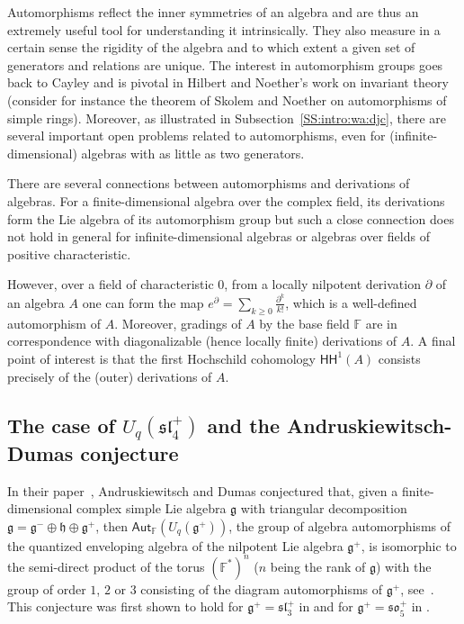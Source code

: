 \documentclass{commat}
\newcommand{\FF}{\mathbb{F}}
\newcommand\aut[1][\FF]{ \mathsf{Aut}_{#1}}
\newcommand\hoch{\mathsf{HH}}
\begin{document}
Automorphisms reflect the inner symmetries of an algebra and are thus an extremely useful tool for understanding it intrinsically. They also measure in a certain sense the rigidity of the algebra and to which extent a given set of generators and relations are unique. The interest in automorphism groups goes back to Cayley and is pivotal in Hilbert and Noether's work on invariant theory (consider for instance the theorem of Skolem and Noether on automorphisms of simple rings). Moreover, as illustrated in Subsection~\ref{SS:intro:wa:djc}, there are several important open problems related to automorphisms, even for (infinite-dimensional) algebras with as little as two generators.

There are several connections between automorphisms and derivations of algebras. For a finite-dimensional algebra over the complex field, its derivations form the Lie algebra of its automorphism group but such a close connection does not hold in general for infinite-dimensional algebras or algebras over fields of positive characteristic. 

However, over a field of characteristic $0$, from a locally nilpotent derivation $\partial$ of an algebra $A$ one can form the map $e^\partial=\sum_{k\geq 0}\frac{\partial^k}{k!}$, which is a well-defined automorphism of $A$. Moreover, gradings of $A$ by the base field $\FF$ are in correspondence with diagonalizable (hence locally finite) derivations of $A$. A final point of interest is that the first Hochschild cohomology $\hoch^1(A)$ consists precisely of the (outer) derivations of $A$.

\subsection{The case of \texorpdfstring{$U_q(\mathfrak{sl}^{+}_{4})$}{Uq(sl4+)} and the Andruskiewitsch-Dumas conjecture}\label{SS:isoautder:ADc}

In their paper~\cite{AD08}, Andruskiewitsch and Dumas conjectured that, given a finite\--di\-men\-sional complex simple Lie algebra $\mathfrak{g}$ with triangular decomposition 
$\mathfrak{g}=\mathfrak{g}^{-}\oplus\mathfrak{h}\oplus\mathfrak{g}^{+}$, then 
$\aut (U_{q}(\mathfrak{g}^{+}))$, the group of algebra automorphisms of the quantized enveloping algebra of the nilpotent Lie algebra $\mathfrak{g}^{+}$, is isomorphic to the semi-direct product of the torus $(\FF^{*})^n$ ($n$ being the rank of $\mathfrak{g}$) with the group of order $1$, $2$ or $3$ consisting of the diagram automorphisms of $\mathfrak{g}^{+}$, see~\cite[Prob.\ 1]{AD08}. This conjecture was first shown to hold for $\mathfrak{g}^{+}=\mathfrak{sl}^{+}_{3}$ in \cite{pC95, AD96} and for $\mathfrak{g}^{+}=\mathfrak{so}^{+}_{5}$ in \cite{sL07}.
\end{document}
